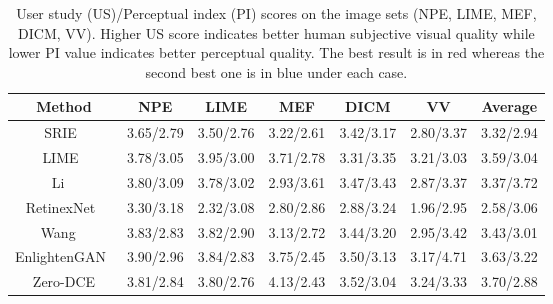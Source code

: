 \documentclass[10pt,twocolumn,letterpaper]{article}
\begin{document}
\begin{table*}[htbp]
\caption{User study (US)/Perceptual index (PI) scores on the image sets (NPE, LIME, MEF, DICM, VV). Higher US score indicates better human subjective visual quality while lower PI value indicates better perceptual quality. The best result is in red whereas the second best one is in blue under each case.}
	\vspace{-0.2cm}
	\centering
	\begin{tabular}{c|c|c|c|c|c|c}
		\hline
		\textbf{Method}               & \textbf{NPE} & \textbf{LIME} &\textbf{MEF}  & \textbf{DICM} & \textbf{VV} & \textbf{Average}\\
		\hline
		SRIE~\cite{Fu2016}           &  3.65/{\color{red}2.79} & 3.50/{\color{red}2.76}               &  3.22/2.61           &  3.42/3.17             & 2.80/3.37                  &3.32/{\color{blue}2.94} \\
		LIME~\cite{Guo2017}          &  3.78/3.05           & {\color{red}3.95}/3.00  &  3.71/2.78            &  3.31/3.35             & {\color{blue}3.21}/{\color{blue}3.03} & 3.59/3.04\\
		Li \etal~\cite{Li2018}           &  3.80/3.09           &3.78/3.02       & 2.93/3.61                &3.47/3.43                & 2.87/3.37                        & 3.37/3.72\\
		RetinexNet~\cite{Chen2018}   &  3.30/3.18           & 2.32/3.08         &2.80/2.86        &  2.88/3.24       & 1.96/{\color{red}2.95}              &2.58/3.06\\
		Wang \etal~\cite{Wang2019}      & {\color{blue}3.83}/{\color{blue}2.83}  & 3.82/2.90     &3.13/2.72           & 3.44/3.20      &  2.95/3.42 & 3.43/3.01  \\
		EnlightenGAN~\cite{Jiang2019}&  {\color{red}3.90}/2.96 & {\color{blue}3.84}/{\color{blue}2.83} & {\color{blue}3.75}/{\color{blue}2.45} &{\color{blue}3.50}/{\color{blue}3.13} & 3.17/4.71              &{\color{blue}3.63}/3.22\\
		Zero-DCE                     &  3.81/2.84 & 3.80/{\color{red}2.76}               &  {\color{red}4.13}/{\color{red}2.43}&  {\color{red}3.52}/{\color{red}3.04} & {\color{red}3.24}/3.33     &{\color{red}3.70}/{\color{red}2.88}\\
		\hline
	\end{tabular}
	\label{label:user study}
		\vspace{-11pt}
\end{table*}


\vspace{-5pt}
\end{document}
